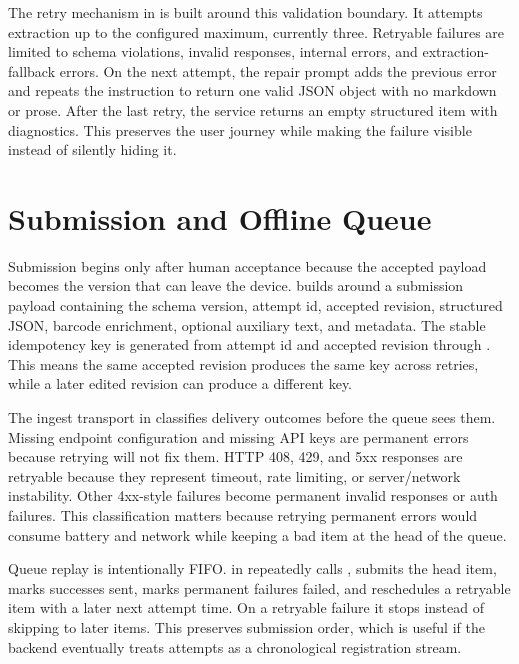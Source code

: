The retry mechanism in  is built around this validation boundary. It attempts extraction up to the configured maximum, currently three. Retryable failures are limited to schema violations, invalid responses, internal errors, and extraction-fallback errors. On the next attempt, the repair prompt adds the previous error and repeats the instruction to return one valid JSON object with no markdown or prose. After the last retry, the service returns an empty structured item with diagnostics. This preserves the user journey while making the failure visible instead of silently hiding it.

\section{Submission and Offline Queue}

Submission begins only after human acceptance because the accepted payload becomes the version that can leave the device.  builds around a submission payload containing the schema version, attempt id, accepted revision, structured JSON, barcode enrichment, optional auxiliary text, and metadata. The stable idempotency key is generated from attempt id and accepted revision through . This means the same accepted revision produces the same key across retries, while a later edited revision can produce a different key.

The ingest transport in  classifies delivery outcomes before the queue sees them. Missing endpoint configuration and missing API keys are permanent errors because retrying will not fix them. HTTP 408, 429, and 5xx responses are retryable because they represent timeout, rate limiting, or server/network instability. Other 4xx-style failures become permanent invalid responses or auth failures. This classification matters because retrying permanent errors would consume battery and network while keeping a bad item at the head of the queue.

Queue replay is intentionally FIFO.  in  repeatedly calls , submits the head item, marks successes sent, marks permanent failures failed, and reschedules a retryable item with a later next attempt time. On a retryable failure it stops instead of skipping to later items. This preserves submission order, which is useful if the backend eventually treats attempts as a chronological registration stream.

